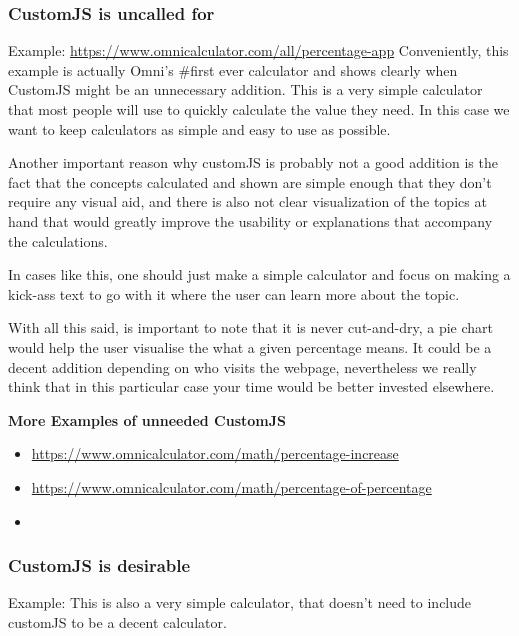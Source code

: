 \subsubsection{CustomJS is uncalled for}
\label{subsub:unneeded}
Example: \href{Simple Percentage}{https://www.omnicalculator.com/all/percentage-app} 
Conveniently, this example is actually Omni's \#first ever calculator and shows clearly when CustomJS might be an unnecessary addition. This is a very simple calculator that most people will use to quickly calculate the value they need. In this case we want to keep calculators as simple and easy to use as possible. 

Another important reason why customJS is probably not a good addition is the fact that the concepts calculated and shown are simple enough that they don't require any visual aid, and there is also not clear visualization of the topics at hand that would greatly improve the usability or explanations that accompany the calculations. 

In cases like this, one should just make a simple calculator and focus on making a kick-ass text to go with it where the user can learn more about the topic. 

With all this said, is important to note that it is never cut-and-dry, a pie chart would help the user visualise the what a given percentage means. It could be a decent addition depending on who visits the webpage, nevertheless we really think that in this particular case your time would be better invested elsewhere. 

\textbf{More Examples of unneeded CustomJS}
\begin{itemize}
    \item \href{Percentage Increase Calculator}{https://www.omnicalculator.com/math/percentage-increase}
    \item \href{Percentage of a Percentage Calculator}{https://www.omnicalculator.com/math/percentage-of-percentage}
    \item \href{Calculator}{}
\end{itemize}

\subsubsection{CustomJS is desirable}
\label{subsub:desireable}
Example: 
This is also a very simple calculator, that doesn't need to include customJS to be a decent calculator. 

